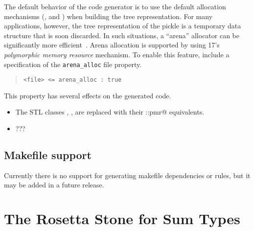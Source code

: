 The default behavior of the \Cplusplus{} code generator is to use the default allocation
mechanisms (\eg{},  and ) when building the tree representation.
For many applications, however, the tree representation of the pickle is a temporary
data structure that is soon discarded.
In such situations, a ``arena'' allocator can be significantly more
efficient~\cite{arena-alloc}.
Arena allocation is supported by \asdlgen{} using \Cplusplus{}17's \emph{polymorphic memory resource}
mechanism.
To enable this feature, include a specification of the \lstinline[language=ASDL]@arena_alloc@
file property.
%
\begin{quote}\begin{lstlisting}[language=ASDL]
<file> <= arena_alloc : true
\end{lstlisting}\end{quote}%
%
This property has several effects on the generated code.
\begin{itemize}
  \item The STL classes \lstinline@string@,  \lstinline@vector@, \etc{} are replaced
    with their  \lstinline@std::pmr@ equivalents.
  \item ???
\end{itemize}%

\subsection{Makefile support}
Currently there is no support for generating makefile dependencies or rules,
but it may be added in a future release.


\section{The Rosetta Stone for Sum Types}
\label{sec:rosetta-stone}

